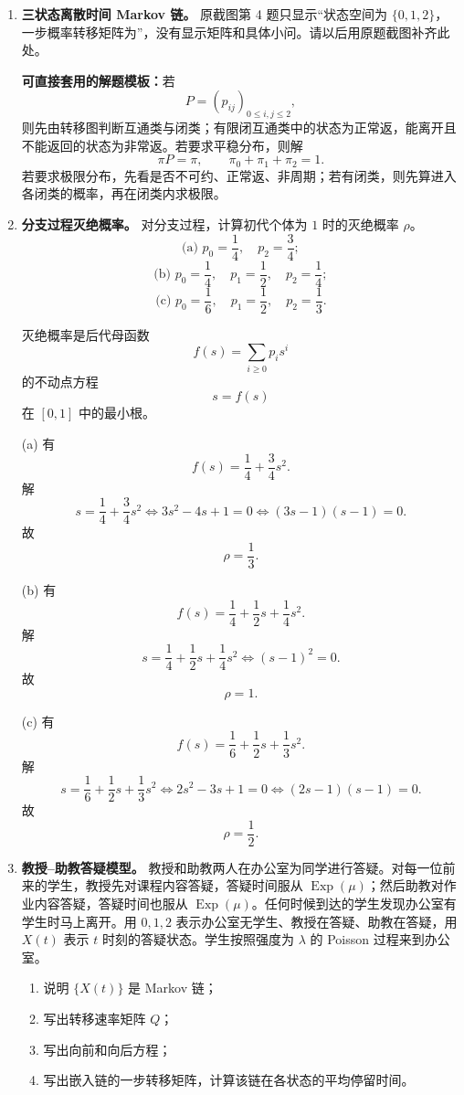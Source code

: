 \documentclass[12pt,a4paper,openany]{ctexrep}
\theoremstyle{definition}
\newcommand{\Exp}{\operatorname{Exp}}
\begin{document}
\begin{enumerate}[label=\textbf{题 \arabic*:}]
	\item \textbf{三状态离散时间 Markov 链。}
	原截图第 4 题只显示“状态空间为 $\{0,1,2\}$，一步概率转移矩阵为”，没有显示矩阵和具体小问。请以后用原题截图补齐此处。

	\textbf{可直接套用的解题模板：}若
	\[
	P=(p_{ij})_{0\le i,j\le2},
	\]
	则先由转移图判断互通类与闭类；有限闭互通类中的状态为正常返，能离开且不能返回的状态为非常返。若要求平稳分布，则解
	\[
	\pi P=\pi,\qquad \pi_0+\pi_1+\pi_2=1.
	\]
	若要求极限分布，先看是否不可约、正常返、非周期；若有闭类，则先算进入各闭类的概率，再在闭类内求极限。

	\item \textbf{分支过程灭绝概率。}
	对分支过程，计算初代个体为 $1$ 时的灭绝概率 $\rho$。
	\[
	\text{(a) }p_0=\frac14,\quad p_2=\frac34;
	\]
	\[
	\text{(b) }p_0=\frac14,\quad p_1=\frac12,\quad p_2=\frac14;
	\]
	\[
	\text{(c) }p_0=\frac16,\quad p_1=\frac12,\quad p_2=\frac13.
	\]

	灭绝概率是后代母函数
	\[
	f(s)=\sum_{i\ge0}p_is^i
	\]
	的不动点方程
	\[
	s=f(s)
	\]
	在 $[0,1]$ 中的最小根。

	(a) 有
	\[
	f(s)=\frac14+\frac34s^2.
	\]
	解
	\[
	s=\frac14+\frac34s^2
	\iff
	3s^2-4s+1=0
	\iff
	(3s-1)(s-1)=0.
	\]
	故
	\[
	\boxed{\rho=\frac13.}
	\]

	(b) 有
	\[
	f(s)=\frac14+\frac12s+\frac14s^2.
	\]
	解
	\[
	s=\frac14+\frac12s+\frac14s^2
	\iff
	(s-1)^2=0.
	\]
	故
	\[
	\boxed{\rho=1.}
	\]

	(c) 有
	\[
	f(s)=\frac16+\frac12s+\frac13s^2.
	\]
	解
	\[
	s=\frac16+\frac12s+\frac13s^2
	\iff
	2s^2-3s+1=0
	\iff
	(2s-1)(s-1)=0.
	\]
	故
	\[
	\boxed{\rho=\frac12.}
	\]

	\item \textbf{教授--助教答疑模型。}
	教授和助教两人在办公室为同学进行答疑。对每一位前来的学生，教授先对课程内容答疑，答疑时间服从 $\Exp(\mu)$；然后助教对作业内容答疑，答疑时间也服从 $\Exp(\mu)$。任何时候到达的学生发现办公室有学生时马上离开。用 $0,1,2$ 表示办公室无学生、教授在答疑、助教在答疑，用 $X(t)$ 表示 $t$ 时刻的答疑状态。学生按照强度为 $\lambda$ 的 Poisson 过程来到办公室。
	\begin{enumerate}[label=(\arabic*)]
		\item 说明 $\{X(t)\}$ 是 Markov 链；
		\item 写出转移速率矩阵 $Q$；
		\item 写出向前和向后方程；
		\item 写出嵌入链的一步转移矩阵，计算该链在各状态的平均停留时间。
	\end{enumerate}


\end{enumerate}
\end{document}
